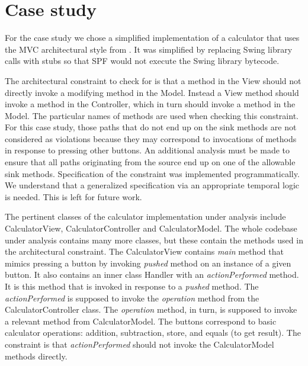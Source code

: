 \documentclass{acm_proc_article-sp}
\begin{document}
\section{Case study}
\label{sec:study}

For the case study we chose a simplified implementation of a calculator that uses the MVC architectural style from \cite{MVC}. It was simplified by replacing Swing library calls with stubs so that SPF would not execute the Swing library bytecode.

The architectural constraint to check for is that a method in the View should not directly invoke a modifying method in the Model. Instead a View method should invoke  a method in the Controller, which in turn should invoke a method in the Model. The particular names of methods are used when checking this constraint. For this case study, those paths that do not end up on the sink methods are not considered as violations because they may correspond to invocations of methods in response to pressing other buttons.
An additional analysis must be made to ensure that all paths originating from the source end up on one of the allowable sink methods.
Specification of the constraint was implemented programmatically. We understand that a generalized specification via an appropriate temporal logic is needed. This is left for future work.

The pertinent classes of the calculator implementation under analysis include CalculatorView, CalculatorController and CalculatorModel. The whole codebase under analysis contains many more classes, but these contain the methods used in the architectural constraint. The CalculatorView contains {\it main} method that mimics pressing a button by invoking {\it pushed} method on an instance of a given button. It also contains an inner class Handler with an {\it actionPerformed} method. It is this method that is invoked in response to a {\it pushed} method. The {\it actionPerformed} is supposed to invoke the {\it operation} method from the CalculatorController class. The {\it operation} method, in turn, is supposed to invoke a relevant method from CalculatorModel. The buttons correspond to basic calculator operations: addition, subtraction, store, and equals (to get result). The constraint is that {\it actionPerformed} should not invoke the CalculatorModel methods directly.
\end{document}
